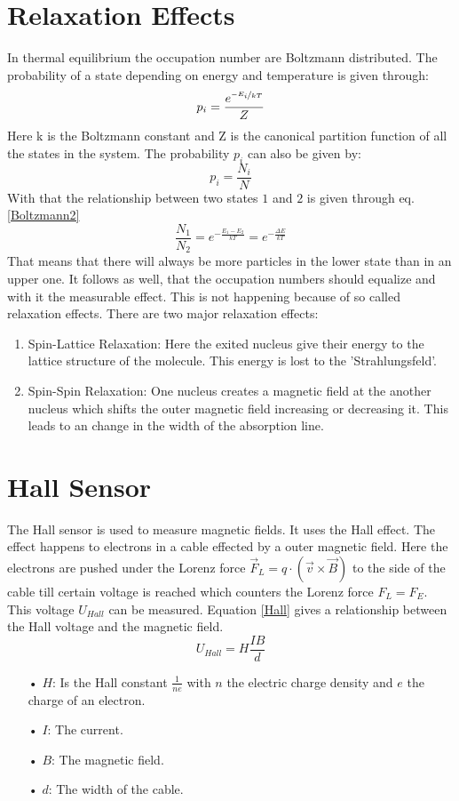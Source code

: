 \section{Relaxation Effects}
In thermal equilibrium the occupation number are Boltzmann distributed.
The probability of a state depending on energy and temperature is given through:
\begin{equation}
p_i=\frac{e^{\nicefrac{-E_i}{kT}}}{Z}
\label{Boltzmann}
\end{equation}
Here k is the Boltzmann constant and Z is the canonical partition function of all the states in the system. The probability $p_i$ can also be given by: $$p_i=\frac{N_i}{N}$$ With that the relationship between two states $1$ and $2$ is given through eq.\ref{Boltzmann2}
\begin{equation}
\frac{N_1}{N_2}=e^{-\frac{E_1-E_2}{kT}}=e^{-\frac{\Delta E}{kT}}
\label{Boltzmann2}
\end{equation}
That means that there will always be more particles in the lower state than in an upper one. It follows as well, that the occupation numbers should equalize and with it the measurable effect. This is not happening because of so called relaxation effects. There are two major relaxation effects:
\begin{enumerate}
	\item Spin-Lattice Relaxation: Here the exited nucleus give their energy to the lattice structure of the molecule. This energy is lost to the 'Strahlungsfeld'.
	\item Spin-Spin Relaxation: One nucleus creates a magnetic field at the another nucleus which shifts the outer magnetic field increasing or decreasing it. This leads to an change in the width of the absorption line.
\end{enumerate} 
\section{Hall Sensor}
The Hall sensor is used to measure magnetic fields. It uses the Hall effect. The effect happens to electrons in a cable effected by a outer magnetic field. Here the electrons are pushed under the Lorenz force $\vec{F}_L=q\cdot(\vec{v}\times \vec{B})$ to the side of the cable till certain voltage is reached which counters the Lorenz force $F_L=F_E$. This voltage $U_{Hall}$ can be measured. Equation \ref{Hall} gives a relationship between the Hall voltage and the magnetic field.
\begin{equation}
U_{Hall}=H\frac{IB}{d}
\label{Hall}
\end{equation}
\begin{enumerate}
	\item[•] $H$: Is the Hall constant $\frac{1}{ne}$ with $n$ the electric charge density and $e$ the charge of an electron.
	\item[•] $I$: The current.
	\item[•] $B$: The magnetic field.
	\item[•] $d$: The width of the cable.
\end{enumerate}
